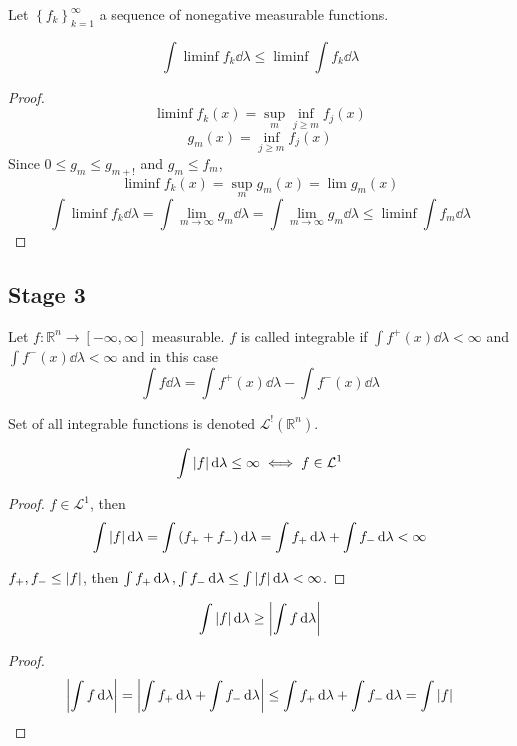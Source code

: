 \begin{theorem}
	Let $\left\{ f_k \right\}_{k=1}^\infty$ a sequence of nonegative measurable functions.
	
	$$\int \liminf f_k \dd{\lambda} \leq \liminf \int f_k \dd{\lambda}$$
	
	\begin{proof}
		$$\liminf f_k(x)  =\sup\limits_m \inf\limits_{j\geq m} f_j(x)$$
		$$g_m(x) = \inf\limits_{j\geq m} f_j(x) $$
		Since $0\leq g_m \leq g_{m+!}$ and $g_m \leq f_m$,
		$$\liminf f_k(x) = \sup\limits_m g_m(x) = \lim g_m(x)$$
		$$\int \liminf f_k \dd{\lambda} =  \int \lim_{m\to \infty} g_m \dd{\lambda} = \int \lim_{m\to \infty}  g_m \dd{\lambda} \leq \liminf \int f_m \dd{\lambda}$$
	\end{proof}
\end{theorem}

\subsection{Stage 3}
\begin{definition}
	Let $f : \mathbb{R}^n \to [-\infty, \infty]$ measurable. $f$ is called integrable if $\int f^+(x) \dd{\lambda} <\infty$ and $\int f^-(x) \dd{\lambda} <\infty$ and in this case
	$$\int f\dd{\lambda} = \int f^+(x) \dd{\lambda}  - \int f^-(x) \dd{\lambda}$$
	
	Set of all integrable functions is denoted $\mathcal{L}^!(\mathbb{R}^n)$.
\end{definition}

\begin{prop}
	$$\int \abs{f} \dd{\lambda} \leq \infty \iff f\in \mathcal{L}^1$$
	\begin{proof}
		$f\in \mathcal{L}^1$, then
		$$\int \abs{f}  \dd{\lambda}  = \int \qty(f_++f_-) \dd{\lambda} = \int f_+ \dd{\lambda} + \int f_- \dd{\lambda} < \infty$$
		
		$f_+, f_- \leq \abs{f}$, then $\int f_+ \dd{\lambda} ,\int f_- \dd{\lambda} \leq  \int \abs{f} \dd{\lambda} < \infty$.
	\end{proof}
\end{prop}
\begin{prop}
$$\int \abs{f} \dd{\lambda} \geq \abs{\int f \dd{\lambda}}$$
\begin{proof}
	$$\abs{\int f \dd{\lambda} } = \abs{\int f_+ \dd{\lambda} +\int f_- \dd{\lambda}  } \leq \int f_+ \dd{\lambda} + \int f_- \dd{\lambda}  = \int \abs{f}$$
\end{proof}
\end{prop}

